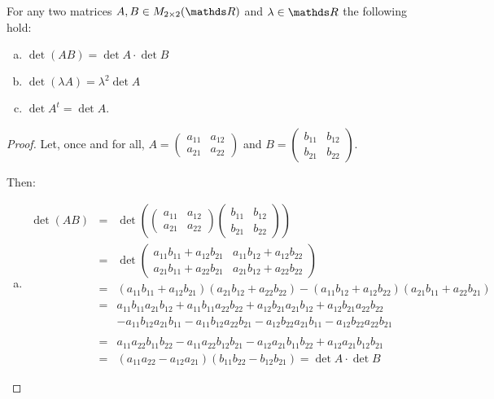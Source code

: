 \begin{lemma}
	For any two matrices $A,B\in M_{2\times 2}(\R)$ and $\lambda\in \R$ the following hold:
	\begin{enumerate}[a)]
		\item $\det(AB)=\det A\cdot\det B$
		\item $\det(\lambda A)=\lambda^2\det A$
		\item $\det A^t=\det A$.
	\end{enumerate}
\end{lemma}
\begin{proof}
	Let, once and for all, $A=\begin{pmatrix}
	a_{11}&a_{12}\\a_{21}&a_{22}
	\end{pmatrix}$ and $B=\begin{pmatrix}
	b_{11}&b_{12}\\b_{21}&b_{22}
	\end{pmatrix}$.
	
	Then:
	\begin{enumerate}[a)]
		\item		
		\[\begin{array}{rcl}
			\det(AB)&=&\det\left(\begin{pmatrix}
			a_{11}&a_{12}\\a_{21}&a_{22}
			\end{pmatrix}\begin{pmatrix}
			b_{11}&b_{12}\\b_{21}&b_{22}
			\end{pmatrix}\right)\\
			&=&\det\begin{pmatrix}
			a_{11}b_{11}+a_{12}b_{21} & a_{11}b_{12}+a_{12}b_{22}\\
			a_{21}b_{11}+a_{22}b_{21} & a_{21}b_{12}+a_{22}b_{22}
			\end{pmatrix}\\
			&=&(a_{11}b_{11}+a_{12}b_{21})(a_{21}b_{12}+a_{22}b_{22})-(a_{11}b_{12}+a_{12}b_{22})(a_{21}b_{11}+a_{22}b_{21})\\
			&=&a_{11}b_{11}a_{21}b_{12}+a_{11}b_{11}a_{22}b_{22}+a_{12}b_{21}a_{21}b_{12}+a_{12}b_{21}a_{22}b_{22}\\
			&&-a_{11}b_{12}a_{21}b_{11}-a_{11}b_{12}a_{22}b_{21}-a_{12}b_{22}a_{21}b_{11}-a_{12}b_{22}a_{22}b_{21}\\\\
			&=&a_{11}a_{22}b_{11}b_{22}-a_{11}a_{22}b_{12}b_{21}-a_{12}a_{21}b_{11}b_{22}+a_{12}a_{21}b_{12}b_{21}\\
			&=&(a_{11}a_{22}-a_{12}a_{21})(b_{11}b_{22}-b_{12}b_{21})=\det A\cdot\det B
		\end{array}\]
		

\end{enumerate}
\end{proof}
